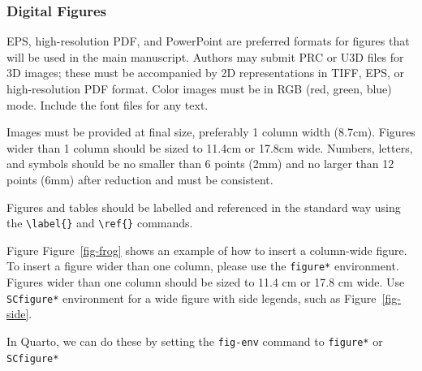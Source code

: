 \documentclass[
  9pt,
  twocolumn,
  twoside]{pnas-new}
\begin{document}
\subsubsection*{Digital Figures}\label{digital-figures}

EPS, high-resolution PDF, and PowerPoint are preferred formats for
figures that will be used in the main manuscript. Authors may submit PRC
or U3D files for 3D images; these must be accompanied by 2D
representations in TIFF, EPS, or high-resolution PDF format. Color
images must be in RGB (red, green, blue) mode. Include the font files
for any text.

Images must be provided at final size, preferably 1 column width
(8.7cm). Figures wider than 1 column should be sized to 11.4cm or 17.8cm
wide. Numbers, letters, and symbols should be no smaller than 6 points
(2mm) and no larger than 12 points (6mm) after reduction and must be
consistent.

Figures and tables should be labelled and referenced in the standard way
using the \texttt{\textbackslash{}label\{\}} and
\texttt{\textbackslash{}ref\{\}} commands.

Figure Figure~\ref{fig-frog} shows an example of how to insert a
column-wide figure. To insert a figure wider than one column, please use
the \texttt{figure*} environment. Figures wider than one column should
be sized to 11.4 cm or 17.8 cm wide. Use \texttt{SCfigure*} environment
for a wide figure with side legends, such as Figure~\ref{fig-side}.

In Quarto, we can do these by setting the \texttt{fig-env} command to
\texttt{figure*} or \texttt{SCfigure*}
\end{document}
